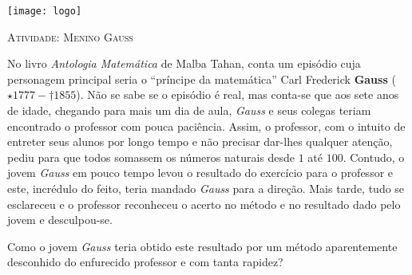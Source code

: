 \documentclass[10 pt,usenames,dvipsnames, oneside]{article}
\begin{document}
\begin{center}
  \begin{minipage}[l]{3cm}
\texttt{[image: logo]}    
\end{minipage}\hfill
\begin{minipage}[r]{.8\textwidth}
 {\Large \scshape Atividade: Menino Gauss}  
\end{minipage}
\end{center}
\vspace{.2cm}






No livro \textit{Antologia Matemática} de Malba Tahan, conta um episódio cuja personagem principal seria o “príncipe da matemática” Carl Frederick \textbf{Gauss} (\(\star 1777- \dagger 1855\)). Não se sabe se o episódio é real, mas conta-se que aos sete anos de idade, chegando para mais um dia de aula, \textit{Gauss} e seus colegas teriam encontrado o professor com pouca paciência. Assim, o professor, com o intuito de entreter seus alunos por longo tempo e não precisar dar-lhes qualquer atenção, pediu para que todos somassem os números naturais desde \(1\) até \(100\). Contudo, o jovem \textit{Gauss} em pouco tempo levou o resultado do exercício para o professor e este, incrédulo do feito, teria mandado \textit{Gauss} para a direção. Mais tarde, tudo se esclareceu e o professor reconheceu o acerto no método e no resultado dado pelo jovem e desculpou-se.

Como o jovem \textit{Gauss} teria obtido este resultado por um método aparentemente desconhido do enfurecido professor e com tanta rapidez?
\end{document}

